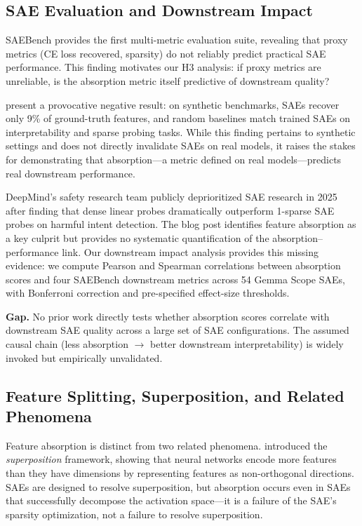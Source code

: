 \documentclass{article}
\begin{document}
\subsection{SAE Evaluation and Downstream Impact}

SAEBench \citep{karvonen2025saebench} provides the first multi-metric evaluation suite, revealing that proxy metrics (CE loss recovered, sparsity) do not reliably predict practical SAE performance. This finding motivates our H3 analysis: if proxy metrics are unreliable, is the absorption metric itself predictive of downstream quality?

\citet{bussmann2025provocative} present a provocative negative result: on synthetic benchmarks, SAEs recover only 9\% of ground-truth features, and random baselines match trained SAEs on interpretability and sparse probing tasks. While this finding pertains to synthetic settings and does not directly invalidate SAEs on real models, it raises the stakes for demonstrating that absorption---a metric defined on real models---predicts real downstream performance.

DeepMind's safety research team publicly deprioritized SAE research in 2025 after finding that dense linear probes dramatically outperform 1-sparse SAE probes on harmful intent detection. The blog post identifies feature absorption as a key culprit but provides no systematic quantification of the absorption--performance link. Our downstream impact analysis provides this missing evidence: we compute Pearson and Spearman correlations between absorption scores and four SAEBench downstream metrics across 54 Gemma Scope SAEs, with Bonferroni correction and pre-specified effect-size thresholds.

\textbf{Gap.} No prior work directly tests whether absorption scores correlate with downstream SAE quality across a large set of SAE configurations. The assumed causal chain (less absorption $\to$ better downstream interpretability) is widely invoked but empirically unvalidated.

\subsection{Feature Splitting, Superposition, and Related Phenomena}

Feature absorption is distinct from two related phenomena. \citet{elhage2022superposition} introduced the \emph{superposition} framework, showing that neural networks encode more features than they have dimensions by representing features as non-orthogonal directions. SAEs are designed to resolve superposition, but absorption occurs even in SAEs that successfully decompose the activation space---it is a failure of the SAE's sparsity optimization, not a failure to resolve superposition.
\end{document}
